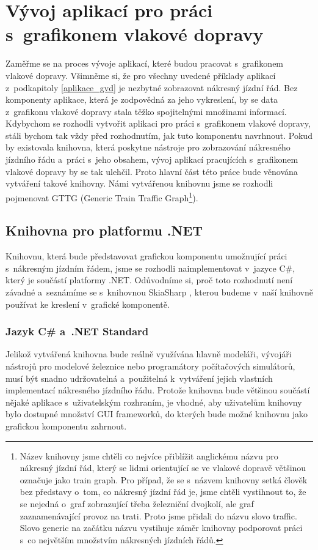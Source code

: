 \section[Vývoj aplikací pro práci s~grafikonem vlakové dopravy]{Vývoj aplikací pro práci\\ s~grafikonem vlakové dopravy}

Zaměřme se na proces vývoje aplikací, které budou pracovat s~grafikonem vlakové dopravy. Všimněme si, že pro všechny uvedené příklady aplikací z~podkapitoly \ref{aplikace_gvd} je nezbytné zobrazovat nákresný jízdní řád. Bez komponenty aplikace, která je zodpovědná za jeho vykreslení, by se data z~grafikonu vlakové dopravy stala těžko spojitelnými množinami informací. Kdybychom se rozhodli vytvořit aplikaci pro práci s~grafikonem vlakové dopravy, stáli bychom tak vždy před rozhodnutím, jak tuto komponentu navrhnout. Pokud by existovala knihovna, která poskytne nástroje pro zobrazování nákresného jízdního řádu a~práci s~jeho obsahem, vývoj aplikací pracujících s~grafikonem vlakové dopravy by se tak ulehčil. Proto hlavní část této práce bude věnována vytváření takové knihovny. Námi vytvářenou knihovnu jsme se rozhodli pojmenovat GTTG (Generic Train Traffic Graph\footnote{Název knihovny jsme chtěli co nejvíce přiblížit anglickému názvu pro nákresný jízdní řád, který se lidmi orientující se ve vlakové dopravě většinou označuje jako train graph. Pro případ, že se s~názvem knihovny setká člověk bez představy o~tom, co nákresný jízdní řád je, jsme chtěli vystihnout to, že se nejedná o~graf zobrazující třeba železniční dvojkolí, ale graf zaznamenávající provoz na trati. Proto jsme přidali do názvu slovo traffic. Slovo generic na začátku názvu vystihuje záměr knihovny podporovat práci s~co největším množstvím nákresných jízdních řádů.}).

\subsection*{Knihovna pro platformu .NET}
Knihovnu, která bude představovat grafickou komponentu umožnující práci s~nákresným jízdním řádem, jsme se rozhodli naimplementovat v~jazyce C\#, který je součástí platformy .NET. Odůvodníme si, proč toto rozhodnutí není závadné a~seznámíme se s~knihovnou SkiaSharp \cite{SkiaSharp}, kterou budeme v~naší knihovně používat ke kreslení v~grafické komponentě.

\subsubsection*{Jazyk C\# a~.NET Standard}
Jelikož vytvářená knihovna bude reálně využívána hlavně modeláři, vývojáři nástrojů pro modelové železnice nebo programátory počítačových simulátorů, musí být snadno udržovatelná a~použitelná k~vytváření jejich vlastních implementací nákresného jízdního řádu. Protože knihovna bude většinou součástí nějaké aplikace s~uživatelským rozhraním, je vhodné, aby uživatelům knihovny bylo dostupné množství GUI frameworků, do kterých bude možné knihovnu jako grafickou komponentu zahrnout.

